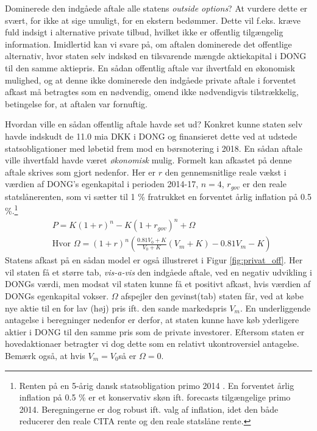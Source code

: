 \documentclass{article}
\begin{document}
Dominerede den indgåede aftale alle statens \emph{outside options}? At vurdere dette er svært, for ikke at sige umuligt, for en ekstern bedømmer. Dette vil f.eks. kræve fuld indsigt i alternative private tilbud, hvilket ikke er offentlig tilgængelig information. Imidlertid kan vi svare på, om aftalen dominerede det offentlige alternativ, hvor staten selv indskød en tilsvarende mængde aktiekapital i DONG til den samme aktiepris. En sådan offentlig aftale var ihvertfald en økonomisk mulighed, og at denne ikke dominerede den indgåede private aftale i forventet afkast må betragtes som en nødvendig, omend ikke nødvendigvis tilstrækkelig, betingelse for, at aftalen var fornuftig. 

Hvordan ville en sådan offentlig aftale havde set ud? Konkret kunne staten selv havde indskudt de 11.0 mia DKK i DONG og finansieret dette ved at udstede statsobligationer med løbetid frem mod en børsnotering i 2018. En sådan aftale ville ihvertfald havde været \emph{økonomisk} mulig. Formelt kan afkastet på denne aftale skrives som gjort nedenfor. Her er $r$ den gennemsnitlige reale vækst i værdien af DONG's egenkapital i perioden 2014-17, $n=4$, $r_{gov}$ er den reale statslånerenten, som vi sætter til 1 \% fratrukket en forventet årlig inflation på 0.5 \%.\footnote{Renten på en 5-årig dansk statsobligation primo 2014 \citep{NB2014}. En forventet årlig inflation på 0.5 \% er et konservativ skøn  ift. forecasts tilgængelige primo 2014. Beregningerne er dog robust ift. valg af inflation, idet den både reducerer den reale CITA rente og den reale statslåne rente.}
\begin{align}
&P=K(1+r)^n-K(1+r_{gov})^n +\Omega \\
&\text{Hvor } \Omega=(1+r)^n\left( \frac{0.81V_0+K}{V_0+K} \left( V_m+K \right)-0.81V_m -K\right)\nonumber
\label{eq:gov_capital}
\end{align}
Statens afkast på en sådan model er også illustreret i Figur \ref{fig:privat_off}. Her vil staten få et større tab, \emph{vis-a-vis} den indgåede aftale, ved en negativ udvikling i DONGs værdi, men modsat vil staten kunne få et positivt afkast, hvis værdien af DONGs egenkapital vokser. $\Omega$ afspejler den gevinst(tab) staten får, ved at købe nye aktie til en for lav (høj) pris ift. den sande markedspris $V_m$. En underliggende antagelse i beregninger nedenfor er derfor, at staten kunne have køb yderligere aktier i DONG til den samme pris som de private investorer. Eftersom staten er hovedaktionaer betragter vi dog dette som en relativt ukontroversiel antagelse. Bemærk også, at hvis $V_m=V_0$så er $\Omega=0$.
\end{document}
